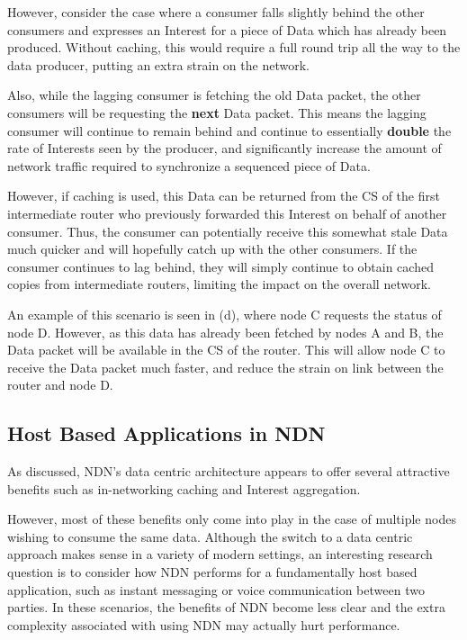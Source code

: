 However, consider the case where a consumer falls slightly behind the other consumers and expresses an Interest for a piece of Data which has already been produced. Without caching, this would require a full round trip all the way to the data producer, putting an extra strain on the network. 

Also, while the lagging consumer is fetching the old Data packet, the other consumers will be requesting the \textbf{next} Data packet. This means the lagging consumer will continue to remain behind and continue to essentially \textbf{double} the rate of Interests seen by the producer, and significantly increase the amount of network traffic required to synchronize a sequenced piece of Data.  

However, if caching is used, this Data can be returned from the CS of the first intermediate router who previously forwarded this Interest on behalf of another consumer. Thus, the consumer can potentially receive this somewhat stale Data much quicker and will hopefully catch up with the other consumers. If the consumer continues to lag behind, they will simply continue to obtain cached copies from intermediate routers, limiting the impact on the overall network.

An example of this scenario is seen in  (d), where node C requests the status of node D. However, as this data has already been fetched by nodes A and B, the Data packet will be available in the CS of the router. This will allow node C to receive the Data packet much faster, and reduce the strain on link between the router and node D.






\subsection{Host Based Applications in NDN}\label{sec:ndn-host-based}
As discussed, NDN's data centric architecture appears to offer several attractive benefits such as in-networking caching and Interest aggregation. 

However, most of these benefits only come into play in the case of multiple nodes wishing to consume the same data. Although the switch to a data centric approach makes sense in a variety of modern settings, an interesting research question is to consider how NDN performs for a fundamentally host based application, such as instant messaging or voice communication between two parties. In these scenarios, the benefits of NDN become less clear and the extra complexity associated with using NDN may actually hurt performance.

